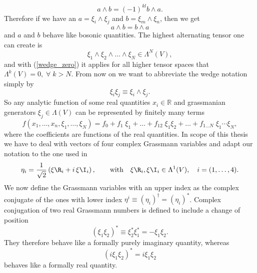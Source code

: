 \begin{equation}
a\wedge b = (-1)^{kl} b\wedge a.
\end{equation}
Therefore if we have an $a=\xi_{i}\wedge\xi_{j}$ and $b=\xi_{m}\wedge\xi_{n}$, then we get
\begin{equation}
a \wedge b = b \wedge a
\end{equation}
and $a$ and $b$ behave like bosonic quantities. The highest alternating tensor one can create is
\begin{equation}
\xi_{1}\wedge\xi_{2}\wedge \ldots\wedge \xi_{N} \in \Lambda^{N}(V),
\end{equation}
and with (\ref{wedge_zero}) it applies for all higher tensor spaces that $\Lambda^{k}(V)=0,\; \forall\; k>N$. From now on we want to abbreviate the wedge notation simply by
\begin{equation}
\xi_{i}\xi_{j} \equiv \xi_{i}\wedge\xi_{j}.
\end{equation}
So any analytic function of some real quantities $x_{i} \in \mathbb{R}$ and grassmanian generators $\xi_{j} \in \Lambda(V)$ can be represented by finitely many terms
\begin{equation}
f(x_{1},\ldots,x_{n},\xi_{1},\ldots,\xi_{N}) = f_{0} + f_{1}\;\xi_{1} +\ldots+ f_{12}\;\xi_{1}\xi_{2} +\ldots+ f_{1\ldots N}\; \xi_{1}\cdots\xi_{N},
\end{equation}
where the coefficients are functions of the real quantities. In scope of this thesis we have to deal with vectors of four complex Grassmann variables and adapt our notation to the one used in \cite{Giombi:2009gd}
\begin{equation}
\eta_{i} =\frac{1}{\sqrt{2}} \left(\xi\R_{i} +i\,\xi\I_{i}\right),\qquad \text{with} \quad \xi\R_{i},\xi\I_{i} \in \Lambda^{1}(V), \quad i=(1,\ldots,4).
\end{equation}
We now define the Grassmann variables with an upper index as the complex conjugate of the ones with lower index $\eta^{i}\equiv \left(\eta_{i}\right)^{\dagger} = \left(\eta_{i}\right)^{\ast}$. Complex conjugation of two real Grassmann numbers is defined to include a change of position
\begin{equation}
\left(\xi_{1}\xi_{2}\right)^{\ast}\equiv \xi_{2}^{\ast}\xi_{1}^{\ast} = -\xi_{1}\xi_{2}.
\end{equation}
They therefore behave like a formally purely imaginary quantity, whereas
\begin{equation}
\left(i\xi_{1}\xi_{2}\right)^{\ast} = i\xi_{1}\xi_{2}
\end{equation}
behaves like a formally real quantity.
%
%
%
%
%
%
%
%
%

